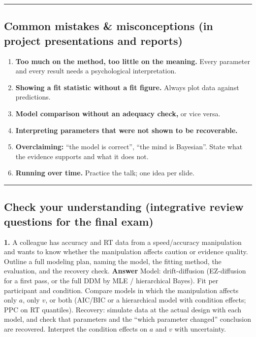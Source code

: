 \begin{center}\rule{0.5\linewidth}{0.5pt}\end{center}

\subsection{Common mistakes \& misconceptions (in project presentations
and reports)}

\begin{enumerate}
\def\labelenumi{\arabic{enumi}.}
\tightlist
\item
  \textbf{Too much on the method, too little on the meaning.} Every
  parameter and every result needs a psychological interpretation.
\item
  \textbf{Showing a fit statistic without a fit figure.} Always plot
  data against predictions.
\item
  \textbf{Model comparison without an adequacy check,} or vice versa.
\item
  \textbf{Interpreting parameters that were not shown to be
  recoverable.}
\item
  \textbf{Overclaiming:} ``the model is correct'', ``the mind is
  Bayesian''. State what the evidence supports and what it does not.
\item
  \textbf{Running over time.} Practice the talk; one idea per slide.
\end{enumerate}

\begin{center}\rule{0.5\linewidth}{0.5pt}\end{center}

\subsection{Check your understanding (integrative review questions for
the final exam)}

\textbf{1.} A colleague has accuracy and RT data from a speed/accuracy
manipulation and wants to know whether the manipulation affects caution
or evidence quality. Outline a full modeling plan, naming the model, the
fitting method, the evaluation, and the recovery check. \textbf{Answer}
Model: drift-diffusion (EZ-diffusion for a first pass, or the full DDM
by MLE / hierarchical Bayes). Fit per participant and condition. Compare
models in which the manipulation affects only \(a\), only \(v\), or both
(AIC/BIC or a hierarchical model with condition effects; PPC on RT
quantiles). Recovery: simulate data at the actual design with each
model, and check that parameters and the ``which parameter changed''
conclusion are recovered. Interpret the condition effects on \(a\) and
\(v\) with uncertainty.

